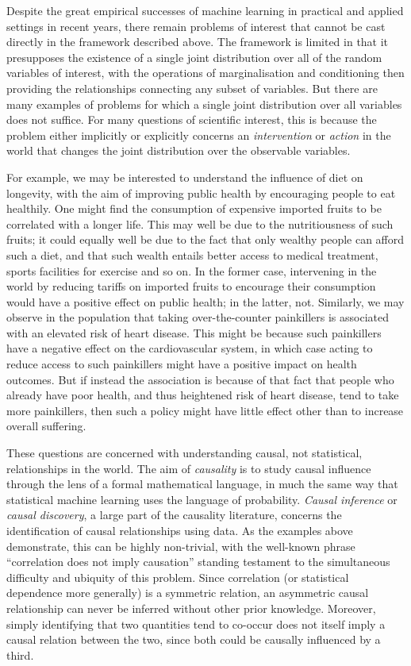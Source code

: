 Despite the great empirical successes of machine learning in practical and applied settings in recent years, there remain problems of interest that cannot be cast directly in the framework described above. 
The framework is limited in that it presupposes the existence of a single joint distribution over all of the random variables of interest, with the operations of marginalisation and conditioning then providing the relationships connecting any subset of variables.
But there are many examples of problems for which a single joint distribution over all variables does not suffice. 
For many questions of scientific interest, this is because the problem either implicitly or explicitly concerns an \emph{intervention} or \emph{action} in the world that changes the joint distribution over the observable variables.

For example, we may be interested to understand the influence of diet on longevity, with the aim of improving public health by encouraging people to eat healthily. 
One might find the consumption of expensive imported fruits to be correlated with a longer life. This may well be due to the nutritiousness of such fruits; it could equally well be due to the fact that only wealthy people can afford such a diet, and that such wealth entails better access to medical treatment, sports facilities for exercise and so on. In the former case, intervening in the world by reducing tariffs on imported fruits to encourage their consumption would have a positive effect on public health; in the latter, not.
Similarly, we may observe in the population that taking over-the-counter painkillers is associated with an elevated risk of heart disease. This might be because such painkillers have a negative effect on the cardiovascular system, in which case acting to reduce access to such painkillers might have a positive impact on health outcomes. But if instead the association is because of that fact that people who already have poor health, and thus heightened risk of heart disease, tend to take more painkillers, then such a policy might have little effect other than to increase overall suffering.

These questions are concerned with understanding causal, not statistical, relationships in the world. 
The aim of \emph{causality} is to study causal influence through the lens of a formal mathematical language, in much the same way that statistical machine learning uses the language of probability. 
\emph{Causal inference} or \emph{causal discovery}, a large part of the causality literature, concerns the identification of causal relationships using data.
As the examples above demonstrate, this can be highly non-trivial, with the well-known phrase ``correlation does not imply causation'' standing testament to the simultaneous difficulty and ubiquity of this problem.
Since correlation (or statistical dependence more generally) is a symmetric relation, an asymmetric causal relationship can never be inferred without other prior knowledge. 
Moreover, simply identifying that two quantities tend to co-occur does not itself imply a causal relation between the two, since both could be causally influenced by a third.

